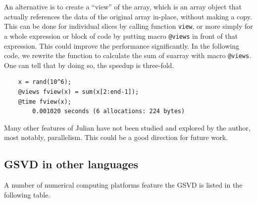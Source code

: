 \begin{itemize}
An alternative is to create a ``view'' of the array, which is an array object that actually references the data of the original array in-place, without making a copy. This can be done for individual slices by calling function \texttt{view}, or more simply for a whole expression or block of code by putting macro \texttt{@views} in front of that expression. This could improve the performance significantly. In the following code, we rewrite the function to calculate the sum of suarray with macro \texttt{@views}. One can tell that by doing so, the speedup is three-fold. 

\begin{verbatim}
    x = rand(10^6);
    @views fview(x) = sum(x[2:end-1]);
    @time fview(x);
        0.001020 seconds (6 allocations: 224 bytes)
\end{verbatim}

\end{itemize} 

Many other features of Julian have not been studied and explored 
by the author, most notably, parallelism. This could be 
a good direction for future work. 


\subsection{GSVD in other languages}  
A number of numerical computing platforms feature 
the GSVD is listed in the following table. 
    
